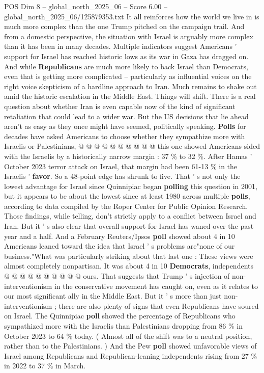 \begin{textsample}{POS Dim 8 – global\_north\_2025\_06 – Score 6.00 – global\_north\_2025\_06/125879353.txt}  \label{ex:f8_pos_432}
It all reinforces how the world we live in is much more complex than the one Trump pitched on the campaign trail.
And from a domestic perspective, the situation with Israel is arguably more complex than it has been in many decades.
Multiple indicators suggest Americans ' support for Israel has reached historic lows as its war in Gaza has dragged on.
And while \textbf{Republicans} are much more likely to back Israel than Democrats, even that is getting more complicated -- particularly as influential voices on the right voice skepticism of a hardline approach to Iran.
Much remains to shake out amid the historic escalation in the Middle East.
Things will shift.
There is a real question about whether Iran is even capable now of the kind of significant retaliation that could lead to a wider war.
But the US decisions that lie ahead aren't as easy as they once might have seemed, politically speaking. \textbf{Polls} for decades have asked Americans to choose whether they sympathize more with Israelis or Palestinians, @ @ @ @ @ @ @ @ @ @ this one showed Americans sided with the Israelis by a historically narrow margin : 37 \% to 32 \%.
After Hamas ' October 2023 terror attack on Israel, that margin had been 61-13 \% in the Israelis ' \textbf{favor}.
So a 48-point edge has shrunk to five.
That ' s not only the lowest advantage for Israel since Quinnipiac began \textbf{polling} this question in 2001, but it appears to be about the lowest since at least 1980 across multiple \textbf{polls}, according to data compiled by the Roper Center for Public Opinion Research.
Those findings, while telling, don't strictly apply to a conflict between Israel and Iran.
But it ' s also clear that overall support for Israel has waned over the past year and a half.
And a February Reuters/Ipsos \textbf{poll} showed about 4 in 10 Americans leaned toward the idea that Israel ' s problems are"none of our business."What was particularly striking about that last one : These views were almost completely nonpartisan.
It was about 4 in 10 \textbf{Democrats}, independents @ @ @ @ @ @ @ @ @ @ ours.
That suggests that Trump ' s injection of non-interventionism in the conservative movement has caught on, even as it relates to our most significant ally in the Middle East.
But it ' s more than just non-interventionism ; there are also plenty of signs that even Republicans have soured on Israel.
The Quinnipiac \textbf{poll} showed the percentage of Republicans who sympathized more with the Israelis than Palestinians dropping from 86 \% in October 2023 to 64 \% today. ( Almost all of the shift was to a neutral position, rather than to the Palestinians. ) And the Pew \textbf{poll} showed unfavorable views of Israel among Republicans and Republican-leaning independents rising from 27 \% in 2022 to 37 \% in March.

\end{textsample}

